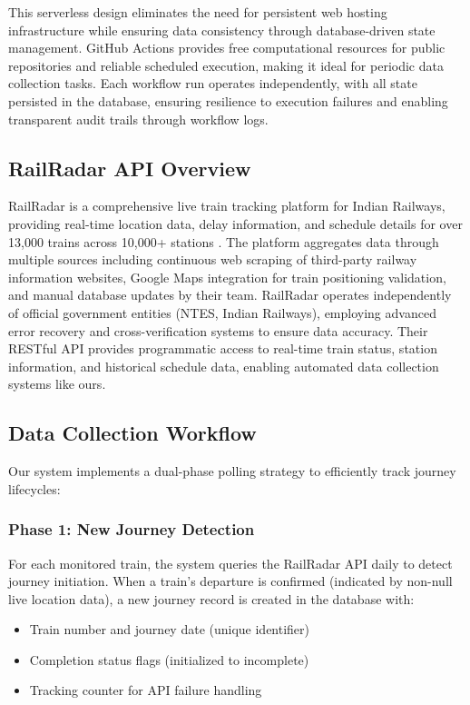 \documentclass[11pt,a4paper]{article}
\begin{document}
This serverless design eliminates the need for persistent web hosting infrastructure while ensuring data consistency through database-driven state management. GitHub Actions provides free computational resources for public repositories and reliable scheduled execution, making it ideal for periodic data collection tasks. Each workflow run operates independently, with all state persisted in the database, ensuring resilience to execution failures and enabling transparent audit trails through workflow logs.

\subsection{RailRadar API Overview}

RailRadar is a comprehensive live train tracking platform for Indian Railways, providing real-time location data, delay information, and schedule details for over 13,000 trains across 10,000+ stations \cite{railradar_about}. The platform aggregates data through multiple sources including continuous web scraping of third-party railway information websites, Google Maps integration for train positioning validation, and manual database updates by their team. RailRadar operates independently of official government entities (NTES, Indian Railways), employing advanced error recovery and cross-verification systems to ensure data accuracy. Their RESTful API provides programmatic access to real-time train status, station information, and historical schedule data, enabling automated data collection systems like ours.

\subsection{Data Collection Workflow}

Our system implements a dual-phase polling strategy to efficiently track journey lifecycles:

\subsubsection{Phase 1: New Journey Detection}

For each monitored train, the system queries the RailRadar API daily to detect journey initiation. When a train's departure is confirmed (indicated by non-null live location data), a new journey record is created in the database with:

\begin{itemize}
    \item Train number and journey date (unique identifier)
    \item Completion status flags (initialized to incomplete)
    \item Tracking counter for API failure handling
\end{itemize}
\end{document}
